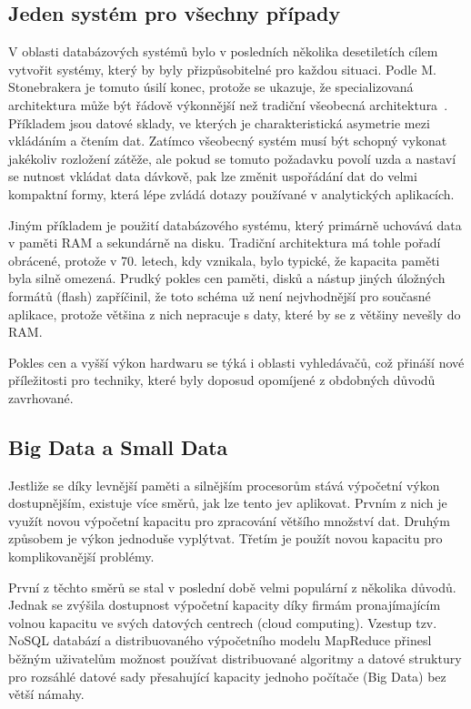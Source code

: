 \documentclass[11pt,letterpaper,oneside,openright]{book}
\begin{document}

\subsection{Jeden systém pro všechny případy}
V oblasti databázových systémů bylo v posledních několika desetiletích cílem
vytvořit systémy, který by byly přizpůsobitelné pro každou situaci. Podle M.
Stonebrakera je tomuto úsilí konec, protože se ukazuje, že specializovaná
architektura může být řádově výkonnější než tradiční všeobecná
architektura~\cite{Stonebraker:2005:OSF:1053724.1054024}. Příkladem jsou datové
sklady, ve kterých je charakteristická asymetrie mezi vkládáním a čtením dat.
Zatímco všeobecný systém musí být schopný vykonat jakékoliv rozložení zátěže,
ale pokud se tomuto požadavku povolí uzda a nastaví se nutnost vkládat data
dávkově, pak lze změnit uspořádání dat do velmi kompaktní formy, která lépe
zvládá dotazy používané v analytických aplikacích.

Jiným příkladem je použití databázového systému, který primárně uchovává data v
paměti RAM a sekundárně na disku. Tradiční architektura má tohle pořadí
obrácené, protože v 70. letech, kdy vznikala, bylo typické, že kapacita paměti
byla silně omezená. Prudký pokles cen paměti, disků a nástup jiných úložných
formátů (flash) zapříčinil, že toto schéma už není nejvhodnější pro současné
aplikace, protože většina z nich nepracuje s daty, které by se z většiny
nevešly do RAM.

Pokles cen a vyšší výkon hardwaru se týká i oblasti vyhledávačů, což přináší
nové příležitosti pro techniky, které byly doposud opomíjené z obdobných důvodů
zavrhované.

\subsection{Big Data a Small Data}
Jestliže se díky levnější paměti a silnějším procesorům stává výpočetní výkon
dostupnějším, existuje více směrů, jak lze tento jev aplikovat. Prvním z nich
je využít novou výpočetní kapacitu pro zpracování většího množství dat. Druhým
způsobem je výkon jednoduše vyplýtvat. Třetím je použít novou kapacitu pro
komplikovanější problémy.

První z těchto směrů se stal v poslední době velmi populární z několika důvodů.
Jednak se zvýšila dostupnost výpočetní kapacity díky firmám pronajímajícím
volnou kapacitu ve svých datových centrech (cloud computing). Vzestup tzv.
NoSQL databází a distribuovaného výpočetního modelu MapReduce přinesl běžným
uživatelům možnost používat distribuované algoritmy a datové struktury pro
rozsáhlé datové sady přesahující kapacity jednoho počítače (Big Data) bez větší
námahy.
\end{document}
